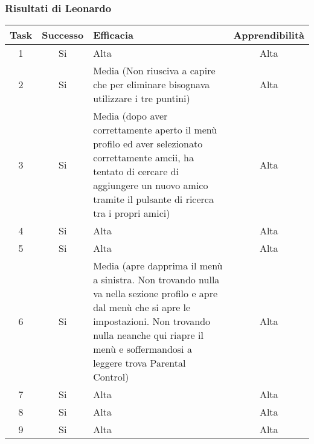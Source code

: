 \documentclass[../Report.tex]{subfiles}
\begin{document}
    \subsubsection{Risultati di Leonardo}
    \begin{table}[H]
        \begin{tabular}{|c|c|p{5cm}|c|}
            \hline
            Task & Successo & Efficacia & Apprendibilità \\
            \hline
            1 & Si & Alta & Alta \\
            \hline
            2 & Si & Media (Non riusciva a capire che per eliminare bisognava utilizzare i tre puntini) & Alta \\
            \hline
            3 & Si & Media (dopo aver correttamente aperto il menù profilo ed aver selezionato correttamente amcii, ha tentato di cercare di aggiungere un nuovo amico tramite il pulsante di ricerca tra i propri amici) & Alta \\
            \hline
            4 & Si & Alta & Alta \\
            \hline
            5 & Si  & Alta  & Alta \\
            \hline
            6 & Si & Media (apre dapprima il menù a sinistra. Non trovando nulla va nella sezione profilo e apre dal menù che si apre le impostazioni. Non trovando nulla neanche qui riapre il menù e soffermandosi a leggere trova Parental Control)  & Alta \\
            \hline
            7 & Si & Alta & Alta \\
            \hline
            8 & Si & Alta & Alta \\
            \hline
            9 & Si & Alta & Alta \\
            \hline
        \end{tabular}

        
    \end{table}
\end{document}
